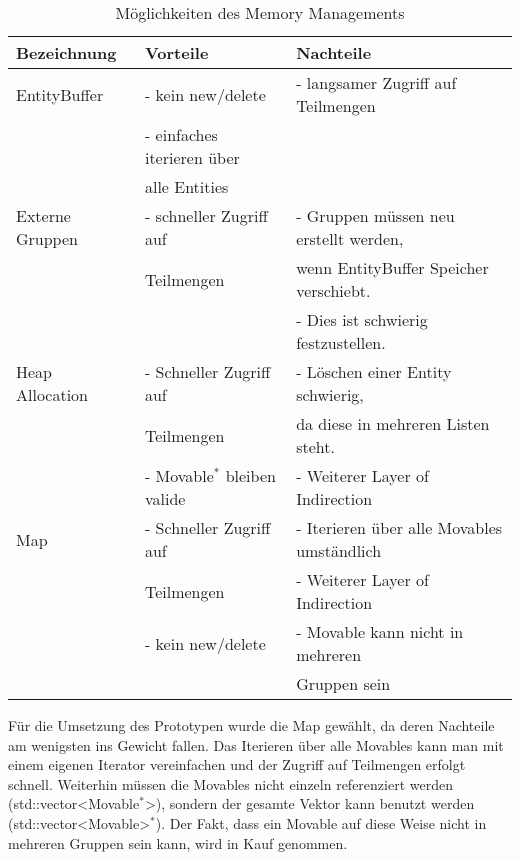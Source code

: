\documentclass[11pt,a4paper]{article}
\begin{document}
\begin{center}
\begin{table}[h!]
\begin{tabular}{l | l | l}
\textbf{Bezeichnung} & \textbf{Vorteile} & \textbf{Nachteile}\\
\hline
EntityBuffer & - kein new/delete & - langsamer Zugriff auf Teilmengen \\
& - einfaches iterieren über\\
& \hspace{4pt} alle Entities\\
 \hline
Externe Gruppen & - schneller Zugriff auf & - Gruppen müssen neu erstellt werden, \\
& \hspace{4pt} Teilmengen &\hspace{4pt}  wenn EntityBuffer Speicher verschiebt. \\
& & - Dies ist schwierig festzustellen. \\
\hline
Heap Allocation & - Schneller Zugriff auf & - Löschen einer Entity schwierig, \\
& \hspace{4pt} Teilmengen & \hspace{4pt} da diese in mehreren Listen steht. \\
& - Movable$^\ast$ bleiben valide & - Weiterer Layer of Indirection\\
\hline
Map & - Schneller Zugriff auf & - Iterieren über alle Movables umständlich \\
& \hspace{4pt} Teilmengen & - Weiterer Layer of Indirection\\
& - kein new/delete& - Movable kann nicht in mehreren \\
& & \hspace{4pt} Gruppen sein \\
\end{tabular}
\captionsetup{justification=centering}
\caption[Möglichkeiten des Memory Managements]{Möglichkeiten des Memory Managements}
\end{table}
\end{center}
\normalsize
Für die Umsetzung des Prototypen wurde die Map gewählt, da deren Nachteile am wenigsten ins Gewicht fallen. Das Iterieren über alle Movables kann man mit einem eigenen Iterator vereinfachen und der Zugriff auf Teilmengen erfolgt schnell. Weiterhin müssen die Movables nicht einzeln referenziert werden (std::vector\textless Movable$^\ast$\textgreater), sondern der gesamte Vektor kann benutzt werden (std::vector\textless Movable\textgreater$^\ast$). Der Fakt, dass ein Movable auf diese Weise nicht in mehreren Gruppen sein kann, wird in Kauf genommen.
\end{document}
